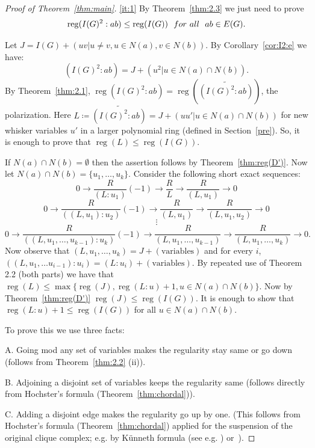 \documentclass[ALCO,published]{cedram}
\numberwithin{equation}{section}
\newcommand \reg{\operatorname{reg}}
\begin{document}




\begin{proof}[Proof of Theorem~\ref{thm:main}]
\ref{it:1} By Theorem~\ref{thm:2.3} we just need to prove
\begin{equation}\label{eq:I(G)^2:ab}
\reg(I(G)^2:ab)\leq \reg(I(G))\ \ {\rm for\  all\ \ } ab \in E(G).
\end{equation}

Let $J=I(G) +(uv|u\neq v, u \in N(a),v\in N(b))$. By Corollary~\ref{cor:I2:e}
we have:$$(I(G)^2:ab)=J+(u^2| u \in N(a) \cap N(b)).$$
By Theorem~\ref{thm:2.1}, $\reg(I(G)^2:ab)  = \reg(\widetilde{(I(G)^2:ab)})$, the polarization. Here $L\coloneqq\widetilde{(I(G)^2:ab)}=
J+(uu'| u \in N(a) \cap N(b))$
for new whisker variables $u'$
 in a larger polynomial ring (defined in Section~\ref{pre}).
So, it is enough to prove that $\reg(L) \leq \reg(I(G))$.


 If $N(a) \cap N(b)=\emptyset$ then the assertion follows by Theorem~\ref{thm:reg(D')}. Now let $N(a) \cap N(b)=\{u_1, \ldots, u_k\}$. Consider the following short exact sequences:
$$0 \longrightarrow \frac{R}{(L:u_1)} (-1) \rightarrow \frac{R}{L} \rightarrow \frac{R}{(L,u_1)} \rightarrow 0$$
$$0 \longrightarrow \frac{R}{((L, u_1):u_2)} (-1) \rightarrow \frac{R}{(L, u_1)} \rightarrow \frac{R}{(L,u_1,u_2)} \rightarrow 0$$
$$\vdots$$
$$0 \longrightarrow \frac{R}{((L,u_1,\ldots ,u_{k-1}):u_k)} (-1) \rightarrow \frac{R}{(L, u_1, \ldots , u_{k-1})} \rightarrow \frac{R}{(L,u_1,\ldots ,u_k)} \rightarrow 0.$$
  Now observe that $(L,u_1,\ldots ,u_k)=J+(\text{variables})$ and for every $i$,  $((L,u_1,\ldots u_{i-1}):u_i)=(L:u_i)+ (\text{variables})$. By repeated use of Theorem 2.2 (both parts) we have that $\reg (L) \leq \max \{ \reg (J), \reg(L:u)+1, u\in N(a) \cap N(b)\}$. Now by Theorem~\ref{thm:reg(D')} $\reg(J) \leq \reg(I(G))$. It is enough to show that $ \reg(L:u)+1 \leq \reg(I(G))$ for all $u \in N(a) \cap N(b)$.

 To prove this we use three facts:

 A. Going mod any set of variables  makes the regularity stay same or go down (follows from Theorem~\ref{thm:2.2} (ii)).

 B. Adjoining a disjoint set of variables keeps the regularity same  (follows directly from Hochster's formula (Theorem~\ref{thm:chordal})).

 C. Adding a disjoint edge makes the regularity go up by one. (This follows from Hochster's formula (Theorem~\ref{thm:chordal}) applied for the suspension of the original clique complex; e.g. by K\"unneth formula (see e.g. \cite[9.12]{ABJ}) or~\cite[Lemma.8]{russ}).


\end{proof}
\end{document}
